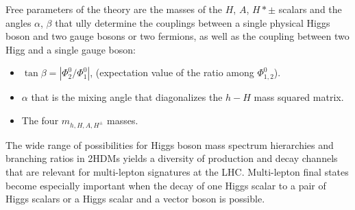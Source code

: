 Free parameters of the theory are the masses of the  $H$, $A$, $H*{\pm}$ scalars and the angles $\alpha$, $\beta$ that  ully determine the couplings between a single physical Higgs boson and two gauge bosons or two fermions, as well as the coupling between two Higg and a single gauge boson:
\begin{itemize}
\item $\tan \beta =| \Phi_2^0 / \Phi_1^0|$, (expectation value of the ratio among $\Phi_{1,2}^0$).
\item $\alpha$ that is the mixing angle that diagonalizes the $h-H$ mass squared matrix.
\item The four $m_{h,H,A,H^{\pm}}$ masses. 
\end{itemize}
The  wide  range  of  possibilities  for  Higgs  boson  mass  spectrum  hierarchies  and  branching
ratios  in  2HDMs  yields  a  diversity  of  production  and  decay  channels  that  are  relevant  for
multi-lepton  signatures  at  the  LHC.  Multi-lepton  final  states  become  especially  important
when the decay of one Higgs scalar to a pair of Higgs scalars or a Higgs scalar and a vector
boson is possible.  


